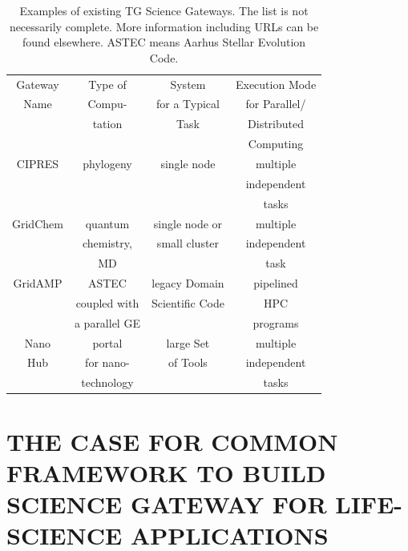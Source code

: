 \documentclass[]{article}
\begin{document}
\begin{table}
 \small
\begin{tabular}{|c|c|c|c|} 
  \hline Gateway  & Type of & System  & Execution Mode 
  \\
  Name & Compu- & for a Typical & for Parallel/ \\ 
  &  tation & Task & Distributed \\
  & & & Computing \\  \hline \hline 
  
  CIPRES   & phylogeny  &  single node  & multiple  \\
   &  &   & independent   \\ 
  &  &  &  tasks \\  \hline
  GridChem   & quantum & single node or     & multiple  \\
     & chemistry, & small cluster & independent   \\
  & MD &  & task  \\ \hline
   GridAMP     & ASTEC  & legacy Domain  & pipelined \\ 
  & coupled with  &  Scientific Code   & HPC  \\
  & a parallel GE &   &  programs \\ \hline
  Nano  & portal  & large Set   & multiple \\
  Hub  & for nano- & of Tools  & independent \\
   & technology &  & tasks \\ \hline
  \hline
\end{tabular} \caption{Examples of existing TG Science Gateways. The list is not necessarily complete. More information including URLs can be found elsewhere\cite{tg-sg-list-url}.  ASTEC means Aarhus Stellar Evolution Code.}
 \label{table:TG-sg} 
\end{table}



\section{THE CASE FOR COMMON FRAMEWORK TO BUILD SCIENCE GATEWAY FOR
  LIFE-SCIENCE APPLICATIONS}

\end{document}
